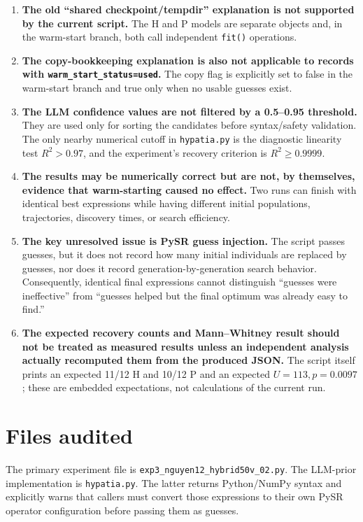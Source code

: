 \documentclass[11pt]{article}
\begin{document}
\begin{enumerate}[leftmargin=*]
    \item \textbf{The old ``shared checkpoint/tempdir'' explanation is not supported by the current script.} The H and P models are separate objects and, in the warm-start branch, both call independent \texttt{fit()} operations.
    \item \textbf{The copy-bookkeeping explanation is also not applicable to records with \texttt{warm\_start\_status=used}.} The copy flag is explicitly set to false in the warm-start branch and true only when no usable guesses exist.
    \item \textbf{The LLM confidence values are not filtered by a 0.5--0.95 threshold.} They are used only for sorting the candidates before syntax/safety validation. The only nearby numerical cutoff in \texttt{hypatia.py} is the diagnostic linearity test \(R^2>0.97\), and the experiment's recovery criterion is \(R^2\ge0.9999\).
    \item \textbf{The results may be numerically correct but are not, by themselves, evidence that warm-starting caused no effect.} Two runs can finish with identical best expressions while having different initial populations, trajectories, discovery times, or search efficiency.
    \item \textbf{The key unresolved issue is PySR guess injection.} The script passes guesses, but it does not record how many initial individuals are replaced by guesses, nor does it record generation-by-generation search behavior. Consequently, identical final expressions cannot distinguish ``guesses were ineffective'' from ``guesses helped but the final optimum was already easy to find.''
    \item \textbf{The expected recovery counts and Mann--Whitney result should not be treated as measured results unless an independent analysis actually recomputed them from the produced JSON.} The script itself prints an expected 11/12 H and 10/12 P and an expected \(U=113,p=0.0097\); these are embedded expectations, not calculations of the current run.
\end{enumerate}

\section{Files audited}

The primary experiment file is \texttt{exp3\_nguyen12\_hybrid50v\_02.py}. The LLM-prior implementation is \texttt{hypatia.py}. The latter returns Python/NumPy syntax and explicitly warns that callers must convert those expressions to their own PySR operator configuration before passing them as guesses.
\end{document}
